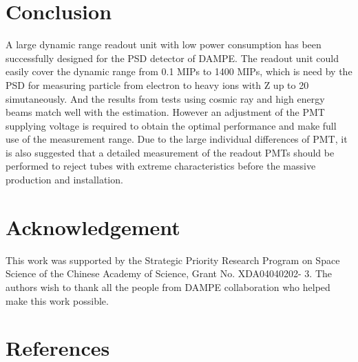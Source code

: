 \documentclass[preprint, times]{elsarticle}
\begin{document}
\section{Conclusion}
\label{sec:conclusion}
A large dynamic range readout unit with low power consumption has been successfully designed for the PSD detector of DAMPE.
The readout unit could easily cover the dynamic range from 0.1 MIPs to 1400 MIPs, which is need by the PSD for measuring particle from electron to heavy ions with Z up to 20 simutaneously. And the results from tests using cosmic ray and high energy beams match well with the estimation.
However an adjustment of the PMT supplying voltage is required to obtain the optimal performance and make full use of the measurement range. Due to the large individual differences of PMT, it is also suggested that a detailed measurement of the readout PMTs should be performed to reject tubes with extreme characteristics before the massive production and installation.

\section*{Acknowledgement}
\label{sec:acknowledgement}

This work was supported by the Strategic Priority Research Program on Space Science of the Chinese Academy of Science,
Grant No. XDA04040202- 3.
The authors wish to thank all the people from DAMPE collaboration who helped make this work possible.

\section*{References}
\label{sec:reference}



\end{document}
